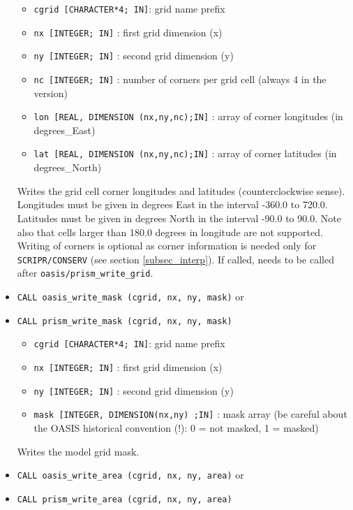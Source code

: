 \begin{itemize}
 \begin{itemize}
    \item {\tt cgrid [CHARACTER*4; IN]}: grid name prefix
    \item {\tt nx [INTEGER; IN]} : first grid dimension (x)
    \item {\tt ny [INTEGER; IN]} : second grid dimension (y)
    \item {\tt nc [INTEGER; IN]} : number of corners per grid cell (always 4 in the version)
    \item {\tt lon [REAL, DIMENSION (nx,ny,nc);IN]} : array of corner
    longitudes (in degrees\_East)
    \item {\tt lat [REAL, DIMENSION (nx,ny,nc);IN]} : array of corner
    latitudes (in degrees\_North)
 \end{itemize}

 Writes the grid cell corner longitudes and latitudes
 (counterclockwise sense). Longitudes must be given in degrees East in
 the interval -360.0 to 720.0. Latitudes must be given in degrees
 North in the interval -90.0 to 90.0. Note also that cells larger than
 180.0 degrees in longitude are not supported. Writing of corners is
 optional as corner information is needed only for {\tt
   SCRIPR/CONSERV} (see section \ref{subsec_interp}). If called, needs
 to be called after {\tt oasis/prism\_write\_grid}.

\vspace{0.2cm}
\item {\tt CALL oasis\_write\_mask (cgrid, nx, ny, mask)} or
\item {\tt CALL prism\_write\_mask (cgrid, nx, ny, mask)}

 \begin{itemize}
    \item {\tt cgrid [CHARACTER*4; IN]}: grid name prefix 
    \item {\tt nx [INTEGER; IN]} : first grid dimension (x)
    \item {\tt ny [INTEGER; IN]} : second grid dimension (y)
    \item {\tt mask [INTEGER, DIMENSION(nx,ny) ;IN]} : mask array (be
      careful about the OASIS historical convention (!): 0 = not masked, 1 = masked)
 \end{itemize}
Writes the model grid mask.

\vspace{0.2cm}
\item {\tt CALL oasis\_write\_area (cgrid, nx, ny, area)} or
\item {\tt CALL prism\_write\_area (cgrid, nx, ny, area)}


\end{itemize}
